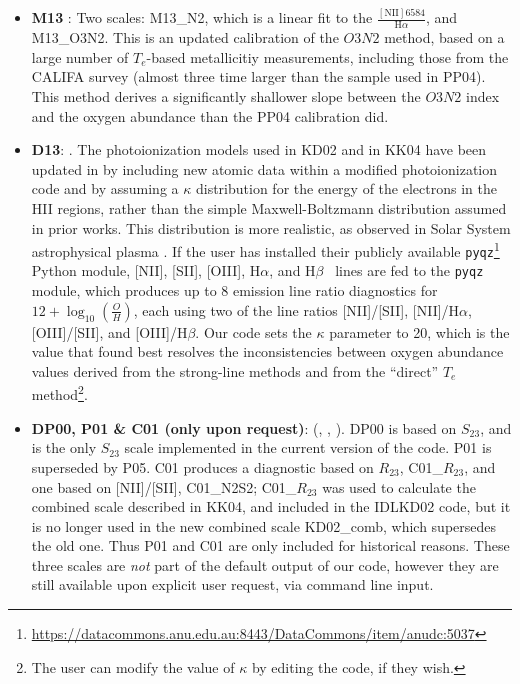 \documentclass{emulateapj}
\newcommand{\oxab}{\ensuremath{12 + \log_{10}(\frac{O}{H})}}
\newcommand{\ha}{H$\alpha$}
\newcommand{\hb}{H$\beta$}
\begin{document}
\begin{itemize}
\item {\bf M13} \citep{marino13}: Two scales: M13\_N2, which is a linear fit to the $\frac{\mathrm{[NII]6584}}{\mathrm{H}\alpha}$, and  M13\_O3N2. This is an updated calibration of the $O3N2$ method, based on a large number of $T_e$-based metallicitiy measurements, including those from the CALIFA survey (almost three time larger than the sample used in PP04). This method derives a significantly shallower slope between the $O3N2$ index and the oxygen abundance than the PP04 calibration did.
\item {\bf D13}: \citep{dopita13}. The photoionization models used in KD02 and in KK04 have been updated in \citet{dopita13} by including new atomic data within a modified photoionization code and by assuming a $\kappa$ distribution for the energy of the electrons in the HII regions, rather than the simple  Maxwell-Boltzmann distribution assumed in prior works. This distribution is more realistic, as observed in Solar System astrophysical plasma \citep{nicholls12}. If the user has installed their publicly available \verb=pyqz=\footnote{\url{https://datacommons.anu.edu.au:8443/DataCommons/item/anudc:5037}} Python module, [NII], [SII], [OIII], \ha, and \hb~ lines are fed to the \verb=pyqz= module, which produces up to 8 emission line ratio diagnostics for \oxab, each using two of the line ratios [NII]/[SII], [NII]/\ha, [OIII]/[SII], and [OIII]/\hb. Our code sets the $\kappa$ parameter to 20, which is the value that \citet{dopita13} found best resolves the inconsistencies between oxygen abundance values derived from the strong-line methods and from the ``direct'' $T_e$ method\footnote{The user can modify the value of $\kappa$ by editing the code, if they wish.}.
\item{\bf DP00, P01 \& C01 (only upon request)}: (\citealt{diaz00}, \citealt{pilyugin01}, \citealt{charlot01}). DP00 is based on $S_{23}$, and is the only $S_{23}$ scale implemented in the current version of the code. P01 is superseded by P05. C01 produces a diagnostic based on $R_{23}$, C01\_$R_{23}$, and one based on [NII]/[SII], C01\_N2S2; C01\_$R_{23}$ was used to calculate the combined scale described in KK04, and included in the IDLKD02 code, but it is no longer used in the new combined scale KD02\_comb, which supersedes the old one. Thus P01 and C01 are only included for historical reasons. These three scales are \emph{not} part of the default output of our code, however they are still available upon explicit user request, via command line input.

\end{itemize}
\end{document}
